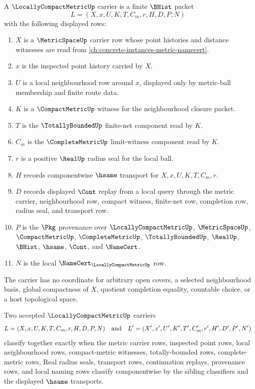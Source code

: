 \begin{definition}
\label{def:locally-compact-metric-carrier}
A $\LocallyCompactMetricUp$ carrier is a finite $\BHist$ packet
$$
L=(X,x,U,K,T,C_m,r,H,D,P,N)
$$
with the following displayed rows:
\begin{enumerate}
\item $X$ is a $\MetricSpaceUp$ carrier row whose point histories and distance witnesses are read from \autoref{ch:concrete-instances-metric-namecert}.
\item $x$ is the inspected point history carried by $X$.
\item $U$ is a local neighbourhood row around $x$, displayed only by metric-ball membership and finite route data.
\item $K$ is a $\CompactMetricUp$ witness for the neighbourhood closure packet.
\item $T$ is the $\TotallyBoundedUp$ finite-net component read by $K$.
\item $C_m$ is the $\CompleteMetricUp$ limit-witness component read by $K$.
\item $r$ is a positive $\RealUp$ radius seal for the local ball.
\item $H$ records componentwise $\hsame$ transport for $X,x,U,K,T,C_m,r$.
\item $D$ records displayed $\Cont$ replay from a local query through the metric carrier, neighbourhood row, compact witness, finite-net row, completion row, radius seal, and transport row.
\item $P$ is the $\Pkg$ provenance over $\LocallyCompactMetricUp$, $\MetricSpaceUp$, $\CompactMetricUp$, $\CompleteMetricUp$, $\TotallyBoundedUp$, $\RealUp$, $\BHist$, $\hsame$, $\Cont$, and $\NameCert$.
\item $N$ is the local $\NameCert_{\LocallyCompactMetricUp}$ row.
\end{enumerate}
The carrier has no coordinate for arbitrary open covers, a selected neighbourhood basis, global compactness of $X$, quotient completion equality, countable choice, or a host topological space.
\end{definition}

\begin{definition}
\label{def:locally-compact-metric-classifier}
Two accepted $\LocallyCompactMetricUp$ carriers
$$
L=(X,x,U,K,T,C_m,r,H,D,P,N)
\quad\hbox{and}\quad
L'=(X',x',U',K',T',C'_m,r',H',D',P',N')
$$
classify together exactly when the metric carrier rows, inspected point rows, local neighbourhood rows, compact-metric witnesses, totally-bounded rows, complete-metric rows, Real radius seals, transport rows, continuation replays, provenance rows, and local naming rows classify componentwise by the sibling classifiers and the displayed $\hsame$ transports.
\end{definition}

